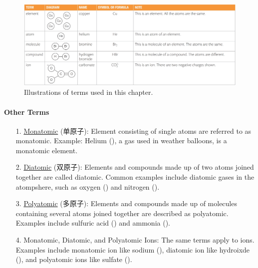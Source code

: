 \begin{figure}[H]
    \centering
    \includegraphics[scale=0.2]{Chemistry/1A/Images/1A-1-1.png}
    \caption{Illustrations of terms used in this chapter.}
\end{figure}

\paragraph{Other Terms}
\begin{itemize}
    \item[1.] \underline{Monatomic} (单原子): Element consisting of single atoms are referred to as monatomic. Example: Helium
    (), a gas used in weather balloons, is a monatomic element.
    \item[2.] \underline{Diatomic} (双原子): Elements and compounds made up of two atoms joined together are called diatomic.
    Common examples include diatomic gases in the atompshere, such as oxygen () and nitrogen ().
    \item[3.] \underline{Polyatomic} (多原子): Elements and compounds made up of molecules containing several atoms joined
    together are described as polyatomic. Examples include sulfuric acid () and ammonia ().
    \item[4.] Monatomic, Diatomic, and Polyatomic Ions: The same terms apply to ions. Examples include monatomic ion like
    sodium (), diatomic ion like hydroixde (), and polyatomic ions like sulfate ().
\end{itemize}